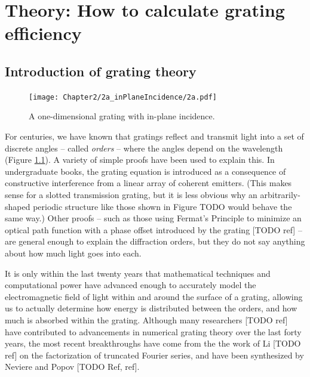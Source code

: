 \chapter{Theory: How to calculate grating efficiency}



\section{Introduction of grating theory}

\begin{figure}[htbp] %
   \centering
   \texttt{[image: Chapter2/2a\_inPlaneIncidence/2a.pdf]} 
   \caption{A one-dimensional grating with in-plane incidence.}
   \label{2a}
\end{figure}

For centuries, we have known that gratings reflect and transmit light into a set of discrete angles -- called \emph{orders} -- where the angles depend on the wavelength  (Figure \ref{2a}).  A variety of simple proofs have been used to explain this.  In undergraduate books, the grating equation is introduced as a consequence of constructive interference from a linear array of coherent emitters. (This makes sense for a slotted transmission grating, but it is less obvious why an arbitrarily-shaped periodic structure like those shown in Figure TODO would behave the same way.)  Other proofs -- such as those using Fermat's Principle to minimize an optical path function with a phase offset introduced by the grating [TODO ref] -- are general enough to explain the diffraction orders, but they do not say anything about how much light goes into each.

It is only within the last twenty years that mathematical techniques and computational power have advanced enough to accurately model the electromagnetic field of light within and around the surface of a grating, allowing us to actually determine how energy is distributed between the orders, and how much is absorbed within the grating.  Although many researchers [TODO ref] have contributed to advancements in numerical grating theory over the last forty years, the most recent breakthroughs have come from the the work of Li [TODO ref] on the factorization of truncated Fourier series, and have been synthesized by Neviere and Popov [TODO Ref, ref].

